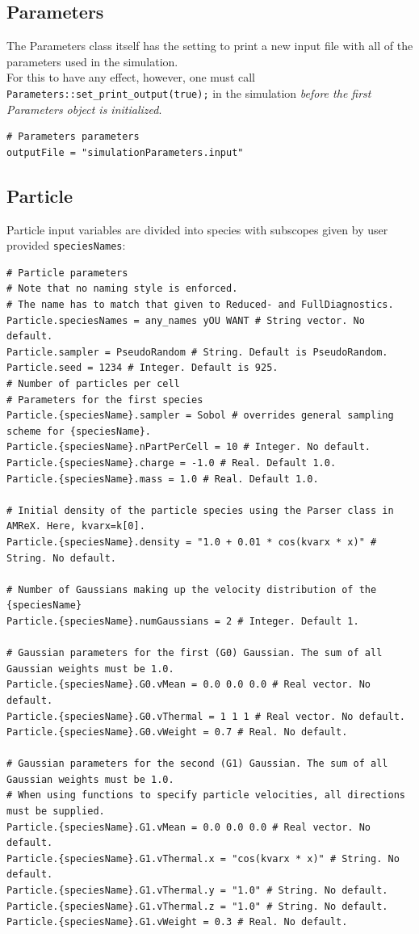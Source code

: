 \documentclass[11pt]{article}
\begin{document}
\subsection{Parameters}
The Parameters class itself has the setting to print a new input file with all of the parameters used in the simulation.\\
For this to have any effect, however, one must call \lstinline|Parameters::set_print_output(true);| in the simulation \emph{before the first Parameters object is initialized}.
\begin{lstlisting}[language=pkgconfig]
# Parameters parameters
outputFile = "simulationParameters.input"
\end{lstlisting}

\subsection{Particle}
Particle input variables are divided into species with subscopes given by user provided \verb|speciesNames|:
\begin{lstlisting}[language=pkgconfig]
# Particle parameters
# Note that no naming style is enforced.
# The name has to match that given to Reduced- and FullDiagnostics.
Particle.speciesNames = any_names yOU WANT # String vector. No default.
Particle.sampler = PseudoRandom # String. Default is PseudoRandom.
Particle.seed = 1234 # Integer. Default is 925.
# Number of particles per cell
# Parameters for the first species
Particle.{speciesName}.sampler = Sobol # overrides general sampling scheme for {speciesName}.
Particle.{speciesName}.nPartPerCell = 10 # Integer. No default.
Particle.{speciesName}.charge = -1.0 # Real. Default 1.0.
Particle.{speciesName}.mass = 1.0 # Real. Default 1.0.

# Initial density of the particle species using the Parser class in AMReX. Here, kvarx=k[0].
Particle.{speciesName}.density = "1.0 + 0.01 * cos(kvarx * x)" # String. No default.

# Number of Gaussians making up the velocity distribution of the {speciesName}
Particle.{speciesName}.numGaussians = 2 # Integer. Default 1.

# Gaussian parameters for the first (G0) Gaussian. The sum of all Gaussian weights must be 1.0.
Particle.{speciesName}.G0.vMean = 0.0 0.0 0.0 # Real vector. No default.
Particle.{speciesName}.G0.vThermal = 1 1 1 # Real vector. No default.
Particle.{speciesName}.G0.vWeight = 0.7 # Real. No default.

# Gaussian parameters for the second (G1) Gaussian. The sum of all Gaussian weights must be 1.0.
# When using functions to specify particle velocities, all directions must be supplied.
Particle.{speciesName}.G1.vMean = 0.0 0.0 0.0 # Real vector. No default.
Particle.{speciesName}.G1.vThermal.x = "cos(kvarx * x)" # String. No default.
Particle.{speciesName}.G1.vThermal.y = "1.0" # String. No default.
Particle.{speciesName}.G1.vThermal.z = "1.0" # String. No default.
Particle.{speciesName}.G1.vWeight = 0.3 # Real. No default.
\end{lstlisting}
\end{document}
